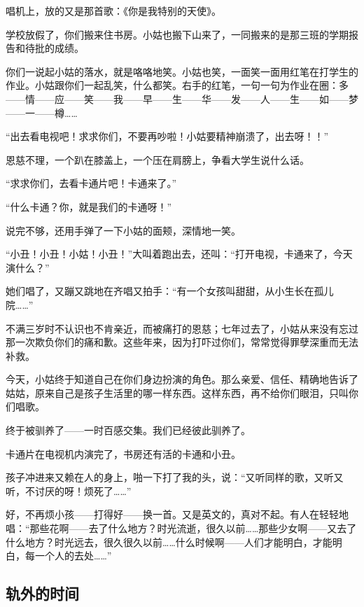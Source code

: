 \par 唱机上，放的又是那首歌：《你是我特别的天使》。
\par 学校放假了，你们搬来住书房。小姑也搬下山来了，一同搬来的是那三班的学期报告和待批的成绩。
\par 你们一说起小姑的落水，就是咯咯地笑。小姑也笑，一面笑一面用红笔在打学生的作业。小姑跟你们一起乱笑，什么都笑。右手的红笔，一句一句为作业在圈：多——情——应——笑——我——早——生——华——发——人——生——如——梦——一——樽……
\par “出去看电视吧！求求你们，不要再吵啦！小姑要精神崩溃了，出去呀！！”
\par 恩慈不理，一个趴在膝盖上，一个压在肩膀上，争看大学生说什么话。
\par “求求你们，去看卡通片吧！卡通来了。”
\par “什么卡通？你，就是我们的卡通呀！”
\par 说完不够，还用手弹了一下小姑的面颊，深情地一笑。
\par “小丑！小丑！小姑！小丑！”大叫着跑出去，还叫：“打开电视，卡通来了，今天演什么？”
\par 她们唱了，又蹦又跳地在齐唱又拍手：“有一个女孩叫甜甜，从小生长在孤儿院……”
\par 不满三岁时不认识也不肯亲近，而被痛打的恩慈；七年过去了，小姑从来没有忘过那一次欺负你们的痛和歉。这些年来，因为打吓过你们，常常觉得罪孽深重而无法补救。
\par 今天，小姑终于知道自己在你们身边扮演的角色。那么亲爱、信任、精确地告诉了姑姑，原来自己是孩子生活里的哪一样东西。这样东西，再不给你们眼泪，只叫你们唱歌。
\par 终于被驯养了——一时百感交集。我们已经彼此驯养了。
\par 卡通片在电视机内演完了，书房还有活的卡通和小丑。
\par 孩子冲进来又赖在人的身上，啪一下打了我的头，说：“又听同样的歌，又听又听，不讨厌的呀！烦死了……”
\par 好，不再烦小孩——打得好——换一首。又是英文的，真对不起。有人在轻轻地唱：“那些花啊——去了什么地方？时光流逝，很久以前……那些少女啊——又去了什么地方？时光远去，很久很久以前……什么时候啊——人们才能明白，才能明白，每一个人的去处……”


\subsection{轨外的时间}

